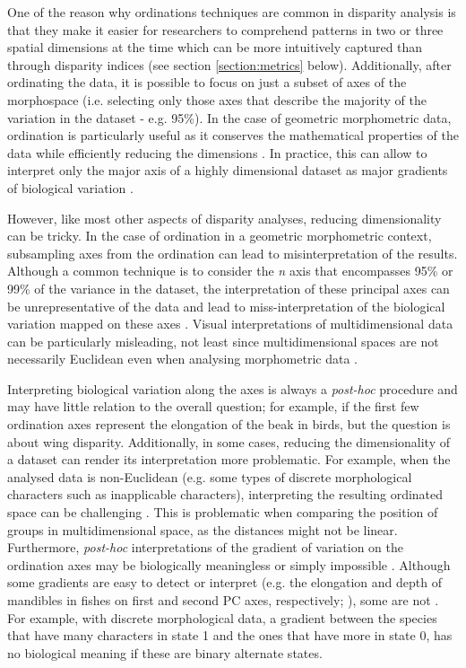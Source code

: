 \documentclass[12pt,letterpaper]{article}
\begin{document}
One of the reason why ordinations techniques are common in disparity analysis is that they make it easier for researchers to comprehend patterns in two or three spatial dimensions at the time which can be more intuitively captured than through disparity indices (see section \ref{section:metrics} below).
Additionally, after ordinating the data, it is possible to focus on just a subset of axes of the morphospace (i.e. selecting only those axes that describe the majority of the variation in the dataset - e.g. 95\%).
In the case of geometric morphometric data, ordination is particularly useful as it conserves the mathematical properties of the data while efficiently reducing the dimensions \citep{Legendre2012-va,dryden2016statistical}.
In practice, this can allow to interpret only the major axis of a highly dimensional dataset as major gradients of biological variation \citep[e.g. the elongation and flattening of birds beaks;][]{Cooney2017-ly}.

However, like most other aspects of disparity analyses, reducing dimensionality can be tricky.
In the case of ordination in a geometric morphometric context, subsampling axes from the ordination can lead to misinterpretation of the results. 
Although a common technique is to consider the \textit{n} axis that encompasses 95\% or 99\% of the variance in the dataset, the interpretation of these principal axes can be unrepresentative of the data and lead to miss-interpretation of the biological variation mapped on these axes \citep{Bookstein2015-yy, Bookstein2017-qk, Bookstein2017-gu,Weisbecker2019-kp}.
Visual interpretations of multidimensional data can be particularly misleading, not least since multidimensional spaces are not necessarily Euclidean even when analysing morphometric data \citep{Deline2018-le, Gerber2017-xi}.

Interpreting biological variation along the axes is always a \textit{post-hoc} procedure and may have little relation to the overall question; for example, if the first few ordination axes represent the elongation of the beak in birds, but the question is about wing disparity.
Additionally, in some cases, reducing the dimensionality of a dataset can render its interpretation more problematic.
For example, when the analysed data is non-Euclidean (e.g. some types of discrete morphological characters such as inapplicable characters), interpreting the resulting ordinated space can be challenging \citep{Gerber2019}.
This is problematic when comparing the position of groups in multidimensional space, as the distances might not be linear.
Furthermore, \textit{post-hoc} interpretations of the gradient of variation on the ordination axes may be biologically meaningless or simply impossible \citep{Gerber2019}.
Although some gradients are easy to detect or interpret (e.g. the elongation and depth of mandibles in fishes on first and second PC axes, respectively; \citealt{Hill2018-ye}), some are not \citep[e.g.][]{Weisbecker2019-kp}.
For example, with discrete morphological data, a gradient between the species that have many characters in state 1 and the ones that have more in state 0, has no biological meaning if these are binary alternate states.
\end{document}
